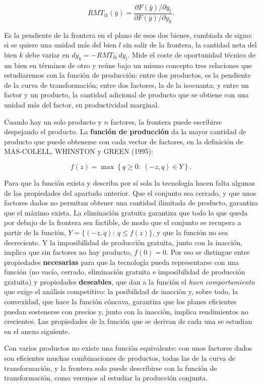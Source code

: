 \documentclass[10pt,a4paper]{article}
\newcounter{anexo}
\begin{document}
$$RMT_{lk}(\bar y)=\frac{\partial F(\bar y)/\partial y_l}{\partial F(\bar y)/\partial y_k}.$$

Es la pendiente de la frontera en el plano de esos dos bienes, cambiada de signo: si se quiere una unidad más del bien $l$ sin salir de la frontera, la cantidad neta del bien $k$ debe variar en $dy_k=-RMT_{lk}\,dy_l$. Mide el coste de oportunidad técnico de un bien en términos de otro y reúne bajo un mismo concepto tres relaciones que estudiaremos con la función de producción: entre dos productos, es la pendiente de la curva de transformación; entre dos factores, la de la isocuanta; y entre un factor y un producto, la cantidad adicional de producto que se obtiene con una unidad más del factor, su productividad marginal.

Cuando hay un solo producto y $n$ factores, la frontera puede escribirse despejando el producto. La \textbf{función de producción} da la mayor cantidad de producto que puede obtenerse con cada vector de factores, en la definición de MAS-COLELL, WHINSTON y GREEN (1995):

$$f(z)=\max\left\{q\ge0:\ (-z,q)\in Y\right\}.$$

Para que la función exista y describa por sí sola la tecnología hacen falta algunas de las propiedades del apartado anterior. Que el conjunto sea cerrado, y que unos factores dados no permitan obtener una cantidad ilimitada de producto, garantiza que el máximo exista. La eliminación gratuita garantiza que todo lo que queda por debajo de la frontera sea factible, de modo que el conjunto se recupera a partir de la función, $Y=\{(-z,q):\ q\le f(z)\}$, y que la función no sea decreciente. Y la imposibilidad de producción gratuita, junto con la inacción, implica que sin factores no hay producto, $f(0)=0$. Por eso se distingue entre propiedades \textbf{necesarias} para que la tecnología pueda representarse con una función (no vacío, cerrado, eliminación gratuita e imposibilidad de producción gratuita) y propiedades \textbf{deseables}, que dan a la función el \textit{buen comportamiento} que exige el análisis competitivo: la posibilidad de inacción y, sobre todo, la convexidad, que hace la función cóncava, garantiza que los planes eficientes puedan sostenerse con precios y, junto con la inacción, implica rendimientos no crecientes. Las propiedades de la función que se derivan de cada una se estudian en el anexo siguiente.

Con varios productos no existe una función equivalente: con unos factores dados son eficientes muchas combinaciones de productos, todas las de la curva de transformación, y la frontera solo puede describirse con la función de transformación, como veremos al estudiar la producción conjunta.
\end{document}
